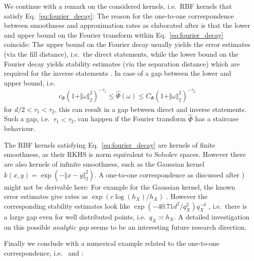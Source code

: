 \documentclass[a4paper, 10pt]{article}
\begin{document}
%
%
%
%
%
%
%
%
%
%
%
%
%
%

We continue with a remark on the considered kernels, i.e.\ RBF kernels that satisfy Eq.~\eqref{eq:fourier_decay}:
The reason for the one-to-one correspondence between smoothness and approximation rates as elaborated after  is that the lower and upper bound on the Fourier transform within Eq.~\eqref{eq:fourier_decay} coincide:
The upper bound on the Fourier decay usually yields the error estimates (via the fill distance), i.e.\ the direct statements,
while the lower bound on the Fourier decay yields stability estimates (via the separation distance) which are required for the inverse statements \cite{schaback2002inverse, schaback1995error}.
In case of a gap between the lower and upper bound, i.e.
\begin{align*}
c_\Phi (1+\Vert \omega \Vert_2^2)^{-\tau_1} \leq \hat{\Phi}(\omega) \leq C_\Phi (1 + \Vert \omega \Vert_2^2)^{-\tau_2}
\end{align*}
for $d/2 < \tau_1 < \tau_2$,
this can result in a gap between direct and inverse statements.
Such a gap, i.e.\ $\tau_1 < \tau_2$, can happen if the Fourier transform $\hat{\Phi}$ has a staircase behaviour.

The RBF kernels satisfying Eq.~\eqref{eq:fourier_decay} are kernels of finite smoothness, as their RKHS is norm equivalent to Sobolev spaces.
However there are also kernels of infinite smoothness, such as the Gaussian kernel $k(x, y) = \exp(- \Vert x - y \Vert_2^2)$.
A one-to-one correspondence as discussed after ) might not be derivable here:
For example for the Gaussian kernel, the known error estimates give rates as $\exp(c \log(h_{X}) / h_{X})$ \cite[Theorem 11.22]{wendland2005scattered}.
However the corresponding stability estimates look like $\exp(-40.71d^2/q_X^2) q_X^{-d}$ \cite[Corollary 12.4]{wendland2005scattered}, 
i.e.\ there is a large gap even for well distributed points, i.e.\ $q_X \asymp h_{X}$.
A detailed investigation on this possible \textit{analytic gap} seems to be an interesting future research direction.


%
%

%
%
%
%

Finally we conclude with a numerical example related to the one-to-one correspondence,
i.e.\  and :
\end{document}
